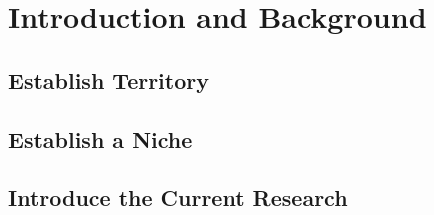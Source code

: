
\cleardoublepage


\chapter{Introduction and Background}



\section{Establish Territory}





\section{Establish a Niche}




\section{Introduce the Current Research}

